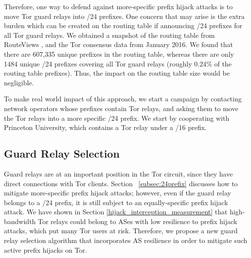 Therefore, one way to defend against more-specific prefix hijack attacks is to move Tor guard relays into /24 prefixes. One concern that may arise is the extra burden which can be created on the routing table if announcing /24 prefixes for all Tor guard relays. We obtained a snapshot of the routing table from RouteViews , and the Tor consensus data from January 2016. We found that there are 607,335 unique prefixes in the routing table, whereas there are only 1484 unique /24 prefixes covering all Tor guard relays (roughly 0.24\% of the routing table prefixes). Thus, the impact on the routing table size would be negligible. 

To make real world impact of this approach, we start a campaign by contacting network operators whose prefixes contain Tor relays, and asking them to move the Tor relays into a more specific /24 prefix. We start by cooperating with Princeton University, which contains a Tor relay under a /16 prefix. 

\subsection{Guard Relay Selection}
\label{subsec:relayselection}

Guard relays are at an important position in the Tor circuit, since they have direct connections with Tor clients. Section ~\ref{subsec:24prefix} discusses how to mitigate more-specific prefix hijack attacks; however, even if the guard relay belongs to a /24 prefix, it is still subject to an equally-specific prefix hijack attack. We have shown in Section \ref{hijack_interception_measurement} that high-bandwidth Tor relays could belong to ASes with low resilience to prefix hijack attacks, which put many Tor users at risk. Therefore, we propose a new guard relay selection algorithm that incorporates AS resilience in order to mitigate such active prefix hijacks on Tor.


